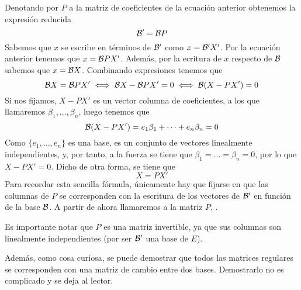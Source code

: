 Denotando por $P$ a la matriz de coeficientes de la ecuación anterior obtenemos la expresión reducida
\begin{equation*}
	\mathcal{B}'=\mathcal{B}P
\end{equation*}
Sabemos que $x$ se escribe en términos de $\mathcal{B}'$ como $x=\mathcal{B'}X'$. Por la ecuación anterior tenemos que $x=\mathcal{B}PX'$. Además, por la ecritura de $x$ respecto de $\mathcal{B}$ sabemos que $x=\mathcal{B}X$. Combinando expresiones tenemos que
\begin{equation*}
	\mathcal{B}X=\mathcal{B}PX'\iff\mathcal{B}X-\mathcal{B}PX'=0\iff\mathcal{B}(X-PX')=0
\end{equation*}
Si nos fijamos, $X-PX'$ es un vector columna de coeficientes, a los que llamaremos $\beta_1,\dots,\beta_n$, luego tenemos que
\begin{equation*}
	\mathcal{B}(X-PX')=e_1\beta_1+\dots+e_n\beta_n=0
\end{equation*}
Como $\{e_1,\dots,e_n\}$ es una base, es un conjunto de vectores linealmente independientes, y, por tanto, a la fuerza se tiene que $\beta_1=\dots=\beta_n=0$, por lo que $X-PX'=0$. Dicho de otra forma, se tiene que
\begin{equation*}
	X = PX'
\end{equation*}
Para recordar esta sencilla fórmula, únicamente hay que fijarse en que las columnas de $P$ se corresponden con la escritura de los vectores de $\mathcal{B}'$ en función de la base $\mathcal{B}$. A partir de ahora llamaremos a la matriz $P$, .

Es importante notar que $P$ es una matriz invertible, ya que sus columnas son linealmente independientes (por ser $\mathcal{B}'$ una base de $E$).

Además, como cosa curiosa, se puede demostrar que todos las matrices regulares se corresponden con una matriz de cambio entre dos bases. Demostrarlo no es complicado y se deja al lector.